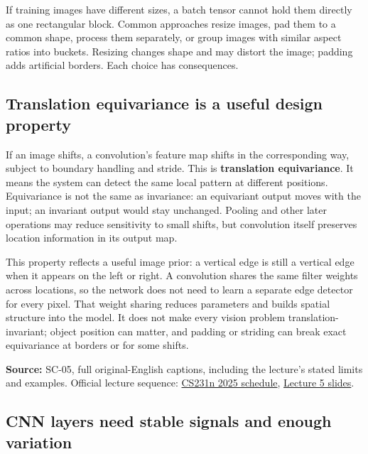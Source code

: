 If training images have different sizes, a batch tensor cannot hold them directly as one rectangular block. Common approaches resize images, pad them to a common shape, process them separately, or group images with similar aspect ratios into buckets. Resizing changes shape and may distort the image; padding adds artificial borders. Each choice has consequences.

\subsection{Translation equivariance is a useful design property}\label{04-visual-computing-ii-ch031-translation-equivariance-is-a-useful-design-property}

\hypertarget{04-visual-computing-ii-ch031-translation-equivariance-is-a-useful-design-property}{}

If an image shifts, a convolution's feature map shifts in the corresponding way, subject to boundary handling and stride. This is \textbf{translation equivariance}. It means the system can detect the same local pattern at different positions. Equivariance is not the same as invariance: an equivariant output moves with the input; an invariant output would stay unchanged. Pooling and other later operations may reduce sensitivity to small shifts, but convolution itself preserves location information in its output map.

This property reflects a useful image prior: a vertical edge is still a vertical edge when it appears on the left or right. A convolution shares the same filter weights across locations, so the network does not need to learn a separate edge detector for every pixel. That weight sharing reduces parameters and builds spatial structure into the model. It does not make every vision problem translation-invariant; object position can matter, and padding or striding can break exact equivariance at borders or for some shifts.

\textbf{Source:} SC-05, full original-English captions, including the lecture's stated limits and examples. Official lecture sequence: \href{https://cs231n.stanford.edu/2025/schedule.html}{CS231n 2025 schedule}, \href{https://cs231n.stanford.edu/slides/2025/lecture_5.pdf}{Lecture 5 slides}.

\subsection{CNN layers need stable signals and enough variation}\label{04-visual-computing-ii-ch031-cnn-layers-need-stable-signals-and-enough-variation}


